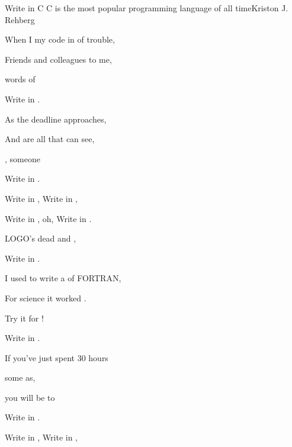 \begin{SBSong}{Write in C}
  {C is the most popular programming language of all time}{Kriston J. Rehberg}

  \begin{SBVerse}
    When I  my code in  of trouble,

     Friends and colleagues  to me,

     words of 

    Write in . 

    As the deadline  approaches,

    And  are all that  can see,

    , someone 

    Write in . 
  \end{SBVerse}
  \begin{SBChorus}
    Write in , Write in ,

    Write in , oh, Write in .

    LOGO's dead and ,

    Write in . 
  \end{SBChorus}
  \begin{SBVerse}
    I used to write a  of FORTRAN,

     For science it worked .

    Try  it for !

    Write in . 

    If you've just spent  30 hours

     some as,

     you will be  to

    Write in . 
  \end{SBVerse}
  \CBPageBrk
  \begin{SBChorus}
    Write in , Write in ,


\end{SBChorus}
\end{SBSong}
